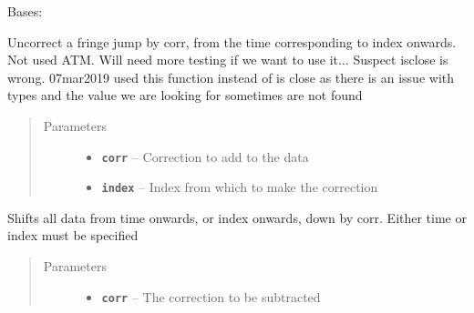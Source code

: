 \documentclass[letterpaper,10pt,english]{sphinxmanual}
\begin{document}
\begin{fulllineitems}
\label{signal_kg1:signal_kg1.SignalKg1}
Bases: {\hyperref[signal_base:signal_base.SignalBase]{}}

\begin{fulllineitems}
\label{signal_kg1:signal_kg1.SignalKg1.uncorrect_fj}
Uncorrect a fringe jump by corr, from the time corresponding to index onwards.
Not used ATM. Will need more testing if we want to use it... Suspect isclose is wrong.
07mar2019
used this function instead of is close as there is an issue with types and the value we are looking for
sometimes are not found
\begin{quote}\begin{description}
\item[{Parameters}] \leavevmode\begin{itemize}
\item {} 
\textbf{\texttt{corr}} -- Correction to add to the data

\item {} 
\textbf{\texttt{index}} -- Index from which to make the correction

\end{itemize}

\end{description}\end{quote}

\end{fulllineitems}


\begin{fulllineitems}
\label{signal_kg1:signal_kg1.SignalKg1.correct_fj}
Shifts all data from time onwards, or index onwards,
down by corr. Either time or index must be specified
\begin{quote}\begin{description}
\item[{Parameters}] \leavevmode\begin{itemize}
\item {} 
\textbf{\texttt{corr}} -- The correction to be subtracted


\end{itemize}
\end{description}
\end{quote}
\end{fulllineitems}
\end{fulllineitems}
\end{document}
